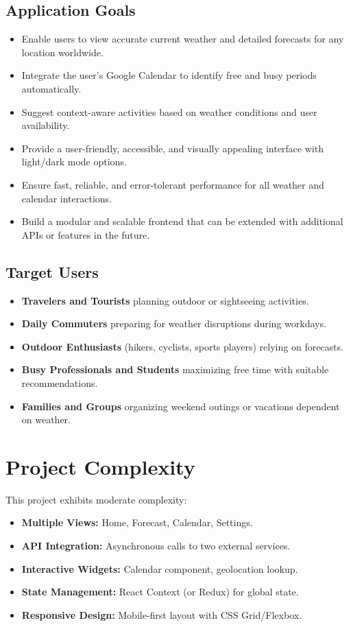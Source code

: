 \documentclass[fontsize=13pt,a4paper]{scrartcl}
\begin{document}
\subsection{Application Goals}
\begin{itemize}[nosep]
  \item Enable users to view accurate current weather and detailed forecasts for any location worldwide.
  \item Integrate the user’s Google Calendar to identify free and busy periods automatically.
  \item Suggest context-aware activities based on weather conditions and user availability.
  \item Provide a user-friendly, accessible, and visually appealing interface with light/dark mode options.
  \item Ensure fast, reliable, and error-tolerant performance for all weather and calendar interactions.
  \item Build a modular and scalable frontend that can be extended with additional APIs or features in the future.
\end{itemize}

\subsection{Target Users}
\begin{itemize}[nosep]
  \item \textbf{Travelers and Tourists} planning outdoor or sightseeing activities.
  \item \textbf{Daily Commuters} preparing for weather disruptions during workdays.
  \item \textbf{Outdoor Enthusiasts} (hikers, cyclists, sports players) relying on forecasts.
  \item \textbf{Busy Professionals and Students} maximizing free time with suitable recommendations.
  \item \textbf{Families and Groups} organizing weekend outings or vacations dependent on weather.
\end{itemize}

\newpage

\section{Project Complexity}
This project exhibits moderate complexity:
\begin{itemize}[nosep]
  \item \textbf{Multiple Views:} Home, Forecast, Calendar, Settings.
  \item \textbf{API Integration:} Asynchronous calls to two external services.
  \item \textbf{Interactive Widgets:} Calendar component, geolocation lookup.
  \item \textbf{State Management:} React Context (or Redux) for global state.
  \item \textbf{Responsive Design:} Mobile-first layout with CSS Grid/Flexbox.
\end{itemize}
\end{document}
